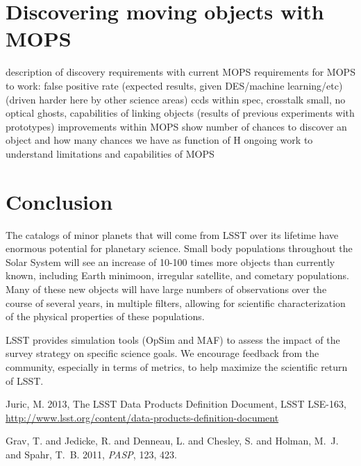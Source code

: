 \documentclass{iau}
\begin{document}
\section{Discovering moving objects with MOPS}
description of discovery requirements with current MOPS
requirements for MOPS to work:
 false positive rate (expected results, given DES/machine
 learning/etc) (driven harder here by other science areas)
   ccds within spec, crosstalk small, no optical ghosts, 
 capabilities of linking objects (results of previous experiments with
 prototypes)  improvements within MOPS
show number of chances to discover an object and how many chances we
have as function of H 
ongoing work to understand limitations and capabilities of MOPS

\section{Conclusion}

The catalogs of minor planets that will come from LSST over its
lifetime have enormous potential for planetary science. Small body
populations throughout the Solar System will see an increase of 10-100
times more objects than currently known, including Earth minimoon,
irregular satellite, and cometary populations. Many of these new
objects will have large numbers of observations over the course of
several years, in multiple filters, allowing for scientific
characterization of the physical properties of these populations.

LSST provides simulation tools (OpSim and MAF) to assess the impact of
the survey strategy on specific science goals. We encourage feedback
from the community, especially in terms of metrics, to help maximize
the scientific return of LSST.



\begin{thebibliography}{}

{Juric, M.} 2013, The LSST Data Products Definition Document, LSST LSE-163,
\url{http://www.lsst.org/content/data-products-definition-document}

 {{Grav}, T. and {Jedicke}, R. and {Denneau}, L. and {Chesley}, S. and 
	{Holman}, M.~J. and {Spahr}, T.~B.} 2011, \textit{PASP}, 123, 423.




\end{thebibliography}

\end{document}
